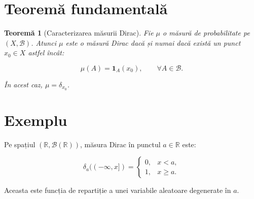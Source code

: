\documentclass[12pt]{article}
\theoremstyle{plain}
\newtheorem{theorem}{Teoremă}
\begin{document}
\section{Teoremă fundamentală}

\begin{theorem}[Caracterizarea măsurii Dirac]
Fie $\mu$ o măsură de probabilitate pe $(X, \mathcal{B})$.
Atunci $\mu$ este o măsură Dirac dacă și numai dacă există un punct $x_0 \in X$ astfel încât:



\[
\mu(A) = \mathbf{1}_A(x_0), \qquad \forall A \in \mathcal{B}.
\]



În acest caz, $\mu = \delta_{x_0}$.
\end{theorem}

\section{Exemplu}

Pe spațiul $(\mathbb{R}, \mathcal{B}(\mathbb{R}))$, măsura Dirac în punctul $a \in \mathbb{R}$ este:



\[
\delta_a((-\infty, x]) =
\begin{cases}
0, & x < a, \\
1, & x \ge a.
\end{cases}
\]



Aceasta este funcția de repartiție a unei variabile aleatoare degenerate în $a$.
\end{document}
